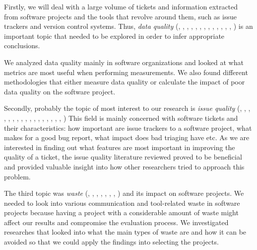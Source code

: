 \documentclass{mprop}
\begin{document}
Firstly, we will deal with a large volume of tickets and information extracted 
from software projects and the tools that revolve around them, such as issue 
trackers and version control systems. Thus, \emph{data quality} (\cite{bachmann2009software}, 
\cite{strong1997data}, \cite{kitchenham1996software},
\cite{stamelos2002code}, \cite{lee2002aimq}, \cite{Heinrich2007MetricsDataQuality},
\cite{nelson2005antecedents}, \cite{pipino2002data}, \cite{wang1998product},
\cite{prybutok2008evaluating}, \cite{gorla2010organizational}, \cite{swanson1997maintaining},
\cite{redman1998impact}, \cite{lee2003knowing}) is an important topic that needed to be explored in order to infer 
appropriate conclusions. 

We analyzed data quality mainly in software organizations and looked at what metrics
are most useful when performing measurements. We also found different
methodologies that either measure data quality or calculate the impact of poor data
quality on the software project. 

Secondly, probably the topic of most interest to our research is \emph{issue quality}
(\cite{bettenburg2008makes}, \cite{hooimeijer2007modeling}, \cite{schroter2010stack},
\cite{bettenburg2008extracting}, \cite{bettenburg2007quality}, \cite{bettenburg2008duplicate},
\cite{bettenburg2012using}, \cite{kim2013should}, \cite{rastkar2010summarizing}, 
\cite{zhou2012should}, \cite{fischer2003analyzing}, \cite{just2008towards}, 
\cite{anvik2006automating}, \cite{anvik2011reducing}, \cite{anvik2006should}, 
\cite{jeong2009improving}, \cite{Naguib2013BugReportAssignee}, \cite{lamkanfi2010predicting})
This field is mainly concerned with software tickets and their characteristics: how
important are issue trackers to a software project, what makes for a good bug report,
what impact does bad triaging have etc. As we are interested in finding out what
features are most important in improving the quality of a ticket, the issue quality
literature reviewed proved to be beneficial and provided valuable insight into
how other researchers tried to approach this problem.

The third topic was \emph{waste} (\cite{sedano2017software}, \cite{Korkala2014WasteIdentification},
\cite{ikonen2010exploring}, \cite{aranda2009secret}, \cite{grimstad2006framework},
\cite{harter2000effects}, \cite{turney2002thumbs}, \cite{wilson2005recognizing}) and its impact on software projects. We needed to
look into various communication and tool-related waste in software projects because
having a project with a considerable amount of waste might affect our results and
compromise the evaluation process. We investigated researches that looked into what
the main types of waste are and how it can be avoided so that
we could apply the findings into selecting the projects.
\end{document}
